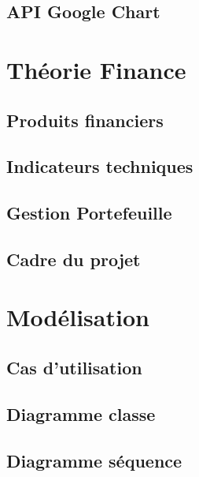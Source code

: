 \documentclass{beamer}
\begin{document}
	    \subsection{API Google Chart} %
	        
	               
        	
     \section{Théorie Finance}
        \subsection{Produits financiers} %
	                
	        
	    \subsection{Indicateurs techniques} %
	        
	          
		\subsection{Gestion Portefeuille} %
	        
	         
	    \subsection{Cadre du projet} %
	        
	            
	        
	        
	 \section{Modélisation}
        \subsection{Cas d'utilisation}
	        
	        
	    \subsection{Diagramme classe}
	        
	            
		\subsection{Diagramme séquence}
	        
	        
\end{document}

